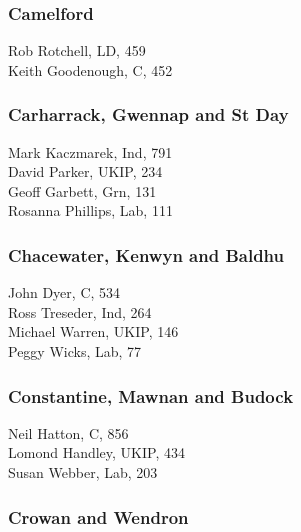 \documentclass[a4paper,openany,10pt]{book}
\begin{document}
\subsubsection*{Camelford}



Rob Rotchell, LD, 459\\
Keith Goodenough, C, 452\\


\subsubsection*{Carharrack, Gwennap and St Day}



Mark Kaczmarek, Ind, 791\\
David Parker, UKIP, 234\\
Geoff Garbett, Grn, 131\\
Rosanna Phillips, Lab, 111\\


\subsubsection*{Chacewater, Kenwyn and Baldhu}



John Dyer, C, 534\\
Ross Treseder, Ind, 264\\
Michael Warren, UKIP, 146\\
Peggy Wicks, Lab, 77\\


\subsubsection*{Constantine, Mawnan and Budock}



Neil Hatton, C, 856\\
Lomond Handley, UKIP, 434\\
Susan Webber, Lab, 203\\


\subsubsection*{Crowan and Wendron}
\end{document}
